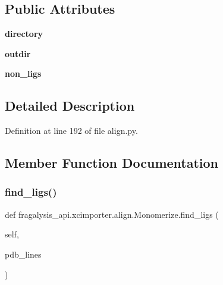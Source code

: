 \subsection*{Public Attributes}
\begin{DoxyCompactItemize}
\item 
\mbox{\label{classfragalysis__api_1_1xcimporter_1_1align_1_1_monomerize_a20636604f47438298d2420ce35297281}} 
{\bfseries directory}
\item 
\mbox{\label{classfragalysis__api_1_1xcimporter_1_1align_1_1_monomerize_a7d47cce7a11f51abbfc8b246b42f5181}} 
{\bfseries outdir}
\item 
\mbox{\label{classfragalysis__api_1_1xcimporter_1_1align_1_1_monomerize_ad165d10ed4bed3d12660094bcd82ea62}} 
{\bfseries non\+\_\+ligs}
\end{DoxyCompactItemize}


\subsection{Detailed Description}


Definition at line 192 of file align.\+py.



\subsection{Member Function Documentation}
\mbox{\label{classfragalysis__api_1_1xcimporter_1_1align_1_1_monomerize_a95bebe718abd76f9546c67db4a1848b3}} 
\subsubsection{\texorpdfstring{find\+\_\+ligs()}{find\_ligs()}}
{\footnotesize\ttfamily def fragalysis\+\_\+api.\+xcimporter.\+align.\+Monomerize.\+find\+\_\+ligs (\begin{DoxyParamCaption}\item[{}]{self,  }\item[{}]{pdb\+\_\+lines }\end{DoxyParamCaption})}

